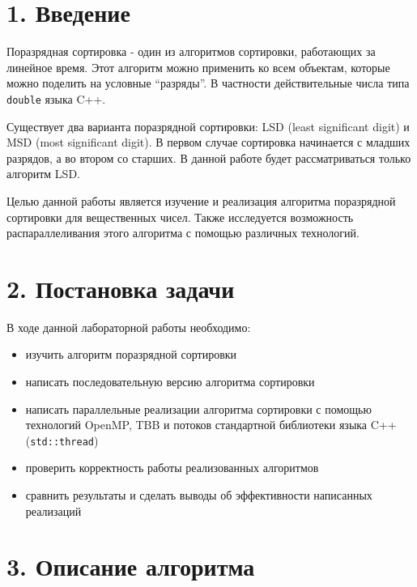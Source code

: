 \documentclass{report}
\begin{document}
    \section*{1. Введение}
    \par Поразрядная сортировка - один из алгоритмов сортировки, работающих за линейное время.
         Этот алгоритм можно применить ко всем объектам, которые можно поделить на условные ``разряды''. В частности действительные числа типа \verb|double| языка C++.
    \par Существует два варианта поразрядной сортировки: LSD (least significant digit) и MSD (most significant digit).
         В первом случае сортировка начинается с младших разрядов, а во втором со старших. В данной работе будет рассматриваться только алгоритм LSD.
    \par Целью данной работы является изучение и реализация алгоритма поразрядной сортировки для вещественных чисел.
         Также исследуется возможность распараллеливания этого алгоритма с помощью различных технологий.


    \newpage
    \section*{2. Постановка задачи}

    \par В ходе данной лабораторной работы необходимо:
    \begin{itemize}
        \item изучить алгоритм поразрядной сортировки
        \item написать последовательную версию алгоритма сортировки
        \item написать параллельные реализации алгоритма сортировки с помощью технологий OpenMP, TBB и потоков стандартной библиотеки языка C++ (\verb|std::thread|)
        \item проверить корректность работы реализованных алгоритмов
        \item сравнить результаты и сделать выводы об эффективности написанных реализаций
    \end{itemize}


    \newpage
    \section*{3. Описание алгоритма}
\end{document}
